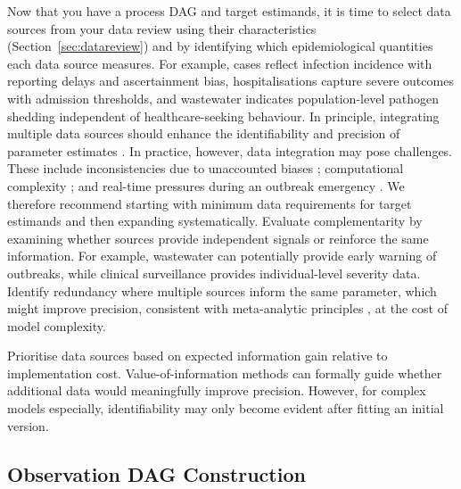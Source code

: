\documentclass{article}
\begin{document}
Now that you have a process DAG and target estimands, it is time to select data sources  from your data review using their characteristics (Section~\ref{sec:datareview}) and by identifying which epidemiological quantities each data source measures. 
For example, cases reflect infection incidence with reporting delays and ascertainment bias, hospitalisations capture severe outcomes with admission thresholds, and wastewater indicates population-level pathogen shedding independent of healthcare-seeking behaviour.
In principle, integrating multiple data sources should enhance the identifiability and precision of parameter estimates \citep{deangelis2018analysing, lison2024generative, russell2024combined, birrell2025real}. In practice, however, data integration may pose challenges. 
These include inconsistencies due to unaccounted biases \citep{presanis2013conflict,knock2021key, Ward2024-sp, corbella2022inferring}; computational complexity \citep{corbella2022inferring}; and real-time pressures during an outbreak emergency \citep{mccaw2023role}.
We therefore recommend starting with minimum data requirements for target estimands and then expanding systematically.
Evaluate complementarity by examining whether sources provide independent signals or reinforce the same information.
For example, wastewater can potentially provide early warning of outbreaks, while clinical surveillance provides individual-level severity data.
Identify redundancy where multiple sources inform the same parameter, which might improve precision, consistent with meta-analytic principles \citep{deangelis2018analysing,borenstein2021introduction}, at the cost of model complexity.

Prioritise data sources based on expected information gain relative to implementation cost.
Value-of-information methods \citep{jackson2019value,heath2024value} can formally guide whether additional data would meaningfully improve precision.
However, for complex models especially, identifiability may only become evident after fitting an initial version.

\subsection{Observation DAG Construction} \label{sec:observation}
\end{document}
